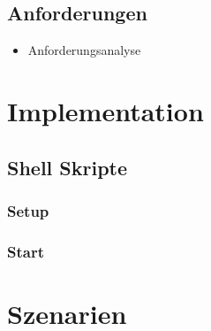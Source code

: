 \documentclass{article}
\begin{document}
\subsection{Anforderungen}

\begin{itemize}
\item Anforderungsanalyse
\end{itemize}

\section{Implementation}

\subsection{Shell Skripte}
\subsubsection{Setup}
\subsubsection{Start}
\section{Szenarien}
\end{document}
